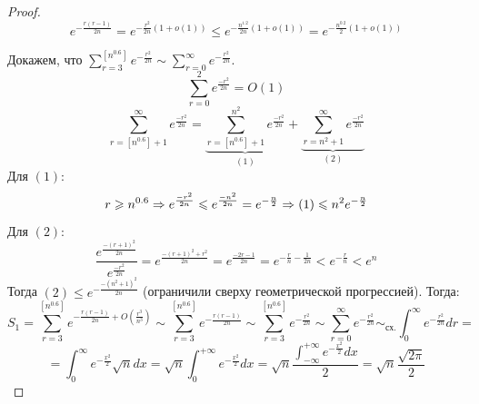\begin{proof}
    \[e^{-\frac{r(r-1)}{2n}} = e^{-\frac{r^2}{2n}(1 + o(1))} \le e^{-\frac{n^{1.2}}{2n}(1 + o(1))} = e^{-\frac{n^{0.2}}{2}(1 + o(1))}\]

    Докажем, что \(\sum_{r = 3}^{[n^{0.6}]}e^{-\frac{r^2}{2n}} \sim \sum_{r = 0}^{\infty}e^{-\frac{r^2}{2n}}\).
    \[\sum_{r = 0}^2e^{\frac{-r^2}{2n}} = O(1)\]
    \[\sum_{r = [n^{0.6}] + 1}^\infty e^{\frac{-r^2}{2n}} = \underbrace{\sum_{r = [n^{0.6}] + 1}^{n^2} e^{\frac{-r^2}{2n}}}_{(1)} + \underbrace{\sum_{r = n^2 + 1}^\infty e^{\frac{-r^2}{2n}}}_{(2)}\]
    Для \((1)\):
    \[r \geqslant n^{0.6} \Rightarrow e^{\frac{-r^2}{2n}} \leqslant e^{\frac{-n^2}{2n}} = e^{-\frac{n}{2}} \Rightarrow (1) \leqslant n^2e^{-\frac{n}{2}}\]
    Для \((2)\):
    \[\frac{e^{\frac{-(r + 1)^2}{2n}}}{e^{\frac{-r^2}{2n}}}= e^{\frac{-(r+1)^2 + r^2}{2n}} = e^{\frac{-2r - 1}{2n}} = e^{-\frac{r}{n} - \frac{1}{2n}} < e^{-\frac{r}{n}} < e^n\]
    Тогда \((2) \le e^{-\frac{-(n^2 + 1)^2}{2n}}\) (ограничили сверху геометрической прогрессией). Тогда:
    \[S_1 = \sum_{r = 3}^{[n^{0.6}]}e^{-\frac{r(r-1)}{2n} + O\left(\frac{r^3}{n^3}\right)} \sim \sum_{r = 3}^{[n^{0.6}]}e^{-\frac{r(r-1)}{2n}} \sim \sum_{r = 3}^{[n^{0.6}]}e^{-\frac{r^2}{2n}} \sim \sum_{r = 0}^{\infty}e^{-\frac{r^2}{2n}} \sim_{\text{сх.}} \int_0^\infty e^{-\frac{r^2}{2n}}dr = \]
    \[ = \int_0^\infty e^{-\frac{x^2}{2}}\sqrt{n}dx = \sqrt{n}\int_{0}^{+\infty} e^{-\frac{x^2}{2}}dx = \sqrt{n}\frac{\int_{-\infty}^{+\infty} e^{-\frac{x^2}{2}}dx}{2} = \sqrt{n}\frac{\sqrt{2\pi}}{2}\]
\end{proof}